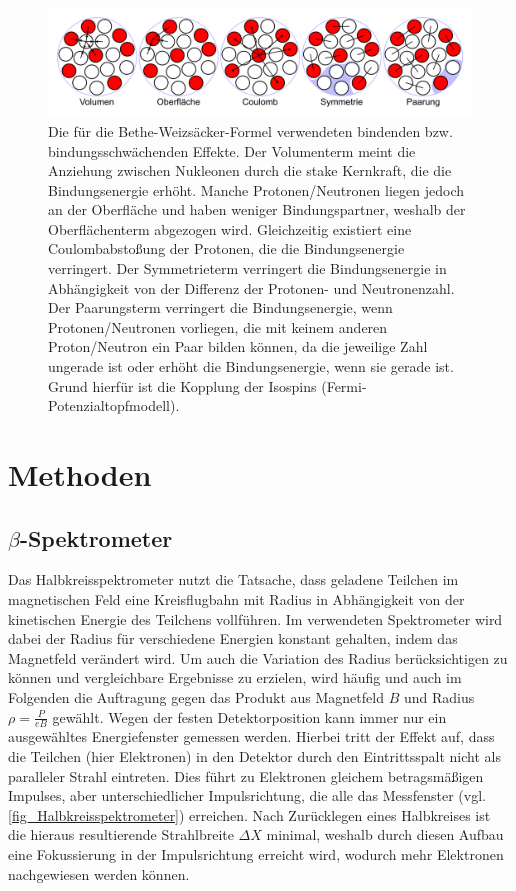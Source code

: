 \documentclass[
	a4paper,
	12pt,
	pagesize,
	ngerman
]{scrartcl}
\begin{document}
		\begin{figure}[H]
				\includegraphics[width= 0.8 \linewidth]{img/Troepfchenmodell}
				\caption{
				Die für die Bethe-Weizsäcker-Formel verwendeten bindenden bzw. bindungsschwächenden Effekte.
				Der Volumenterm meint die Anziehung zwischen Nukleonen durch die stake Kernkraft, die die Bindungsenergie erhöht.
				Manche Protonen/Neutronen liegen jedoch an der Oberfläche und haben weniger Bindungspartner, weshalb der Oberflächenterm abgezogen wird.
				Gleichzeitig existiert eine Coulombabstoßung der Protonen, die die Bindungsenergie verringert.
				Der Symmetrieterm verringert die Bindungsenergie in Abhängigkeit von der Differenz der Protonen- und Neutronenzahl.
				Der Paarungsterm verringert die Bindungsenergie, wenn Protonen/Neutronen vorliegen, die mit keinem anderen Proton/Neutron ein Paar bilden können, da die jeweilige Zahl ungerade ist oder erhöht die Bindungsenergie, wenn sie gerade ist.
				Grund hierfür ist die Kopplung der Isospins (Fermi-Potenzialtopfmodell).
				\cite{bethewiki}
				}
				\label{bethe}
		\end{figure}

	\section{Methoden}
	\subsection{$\beta$-Spektrometer}
	Das Halbkreisspektrometer nutzt die Tatsache, dass geladene Teilchen im magnetischen Feld eine Kreisflugbahn mit Radius in Abhängigkeit von der kinetischen Energie des Teilchens vollführen.
	Im verwendeten Spektrometer wird dabei der Radius für verschiedene Energien konstant gehalten, indem das Magnetfeld verändert wird.
	Um auch die Variation des Radius berücksichtigen zu können und vergleichbare Ergebnisse zu erzielen, wird häufig und auch im Folgenden die Auftragung gegen das Produkt aus Magnetfeld $B$ und Radius $\rho = \frac{P}{eB}$ gewählt.
	Wegen der festen Detektorposition kann immer nur ein ausgewähltes Energiefenster gemessen werden.
	Hierbei tritt der Effekt auf, dass die Teilchen (hier Elektronen) in den Detektor durch den Eintrittsspalt nicht als paralleler Strahl eintreten.
	Dies führt zu Elektronen gleichem betragsmäßigen Impulses, aber unterschiedlicher Impulsrichtung, die alle das Messfenster (vgl. \cref{fig_Halbkreisspektrometer}) erreichen.
	Nach Zurücklegen eines Halbkreises ist die hieraus resultierende Strahlbreite $\Delta X$ minimal, weshalb durch diesen Aufbau eine Fokussierung in der Impulsrichtung erreicht wird, wodurch mehr Elektronen nachgewiesen werden können.
\end{document}
